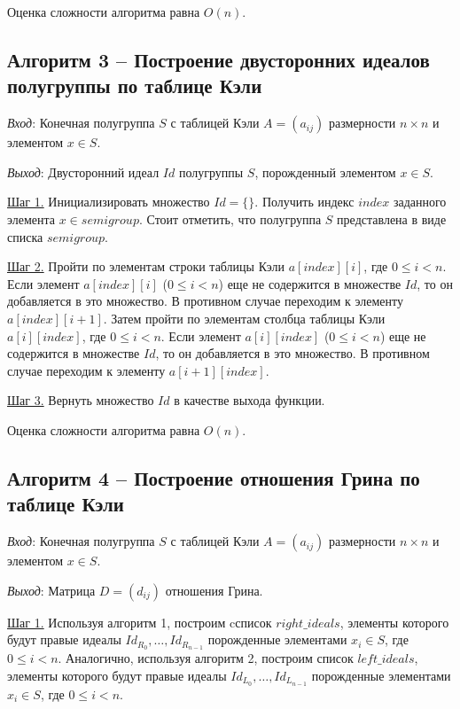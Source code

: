 \documentclass[bachelor, och, labwork]{shiza}
\begin{document}
      Оценка сложности алгоритма равна $O(n)$.

      \subsection{Алгоритм 3 -- Построение двусторонних идеалов полугруппы по таблице Кэли}

    \textit{Вход}: Конечная полугруппа $S$ с таблицей Кэли $A = (a_{ij})$ размерности $n \times n$ и элементом $x \in S$.

    \textit{Выход}: Двусторонний идеал $Id$ полугруппы $S$, порожденный элементом $x \in S$.
    
    \underline{Шаг 1.} Инициализировать множество $Id = \{\}$. Получить индекс $index$ заданного элемента $x \in semigroup$.
    Стоит отметить, что полугруппа $S$ представлена в виде списка $semigroup$.
    
    \underline{Шаг 2.} Пройти по элементам строки таблицы Кэли $a[index][i]$, где $0 \leq i < n$. Если элемент $a[index][i]$ ($0 \leq i < n$) еще не содержится
    в множестве $Id$, то он добавляется в это множество. В противном случае переходим к элементу $a[index][i + 1]$. Затем пройти по элементам столбца
    таблицы Кэли $a[i][index]$, где $0 \leq i < n$. Если элемент $a[i][index]$ ($0 \leq i < n$) еще не содержится в множестве $Id$, то он добавляется
    в это множество. В противном случае переходим к элементу $a[i + 1][index]$.
    
    \underline{Шаг 3.} Вернуть множество $Id$ в качестве выхода функции.
    
      Оценка сложности алгоритма равна $O(n)$.


    \subsection{Алгоритм 4 -- Построение отношения Грина по таблице Кэли}

    \textit{Вход}: Конечная полугруппа $S$ с таблицей Кэли $A = (a_{ij})$ размерности $n \times n$ и элементом $x \in S$.

    \textit{Выход}: Матрица $D = (d_{ij})$ отношения Грина.
    
    \underline{Шаг 1.} Используя алгоритм 1, построим cсписок $right\_ideals$, элементы которого будут правые идеалы $Id_{R_0}, \dots, Id_{R_{n-1}}$ порожденные
    элементами $x_i \in S$, где $0 \leq i < n$. Аналогично, используя алгоритм 2, построим список $left\_ideals$, элементы которого будут правые идеалы
    $Id_{L_0}, \dots, Id_{L_{n-1}}$ порожденные элементами $x_i \in S$, где $0 \leq i < n$.
    
\end{document}
